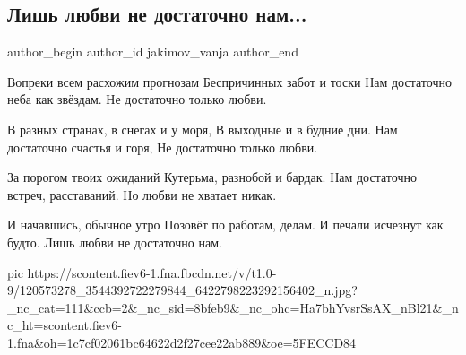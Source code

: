  
 
 
 
 
 
\subsection{Лишь любви не достаточно нам...}
\label{sec:01_10_2020.fb.jakimov_vanja.1.lish_ljubvi_ne_dostatochno_nam}
\ifcmt
	author_begin
   author_id jakimov_vanja
	author_end
\fi

\begin{multicols}{2}
	\obeycr
Вопреки всем расхожим прогнозам
Беспричинных забот и тоски
Нам достаточно неба как звёздам.
Не достаточно только любви.

В разных странах, в снегах и у моря,
В выходные и в будние дни.
Нам достаточно счастья и горя,
Не достаточно только любви.

За порогом твоих ожиданий
Кутерьма, разнобой и бардак.
Нам достаточно встреч, расставаний.
Но любви не хватает никак.

И начавшись, обычное утро
Позовёт по работам, делам.
И печали исчезнут как будто.
Лишь любви не достаточно нам.
	\restorecr
\end{multicols}

\ifcmt
pic https://scontent.fiev6-1.fna.fbcdn.net/v/t1.0-9/120573278_3544392722279844_6422798223292156402_n.jpg?_nc_cat=111&ccb=2&_nc_sid=8bfeb9&_nc_ohc=Ha7bhYvsrSsAX_nBl21&_nc_ht=scontent.fiev6-1.fna&oh=1c7cf02061bc64622d2f27cee22ab889&oe=5FECCD84
\fi
